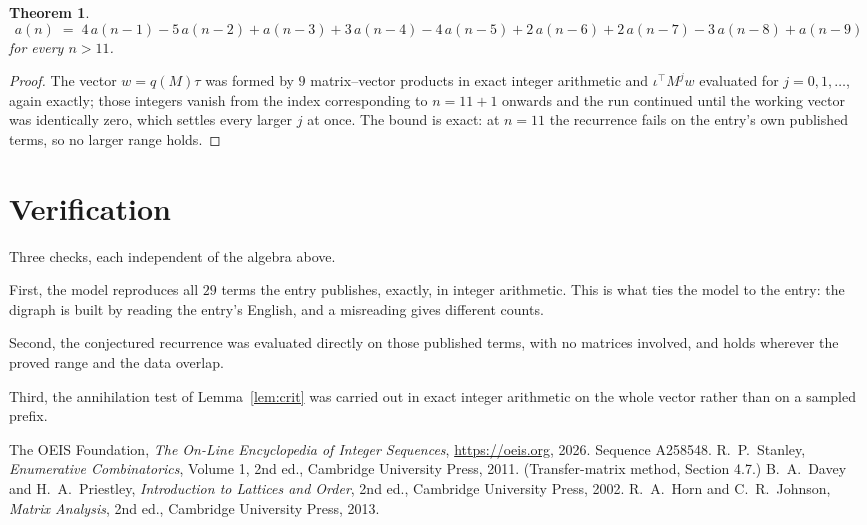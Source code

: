 \documentclass[11pt,a4paper]{article}
\theoremstyle{plain}
\newtheorem{theorem}{Theorem}
\theoremstyle{definition}
\begin{document}
\begin{theorem}
\[
a(n)\;=\;4\,a(n-1) - 5\,a(n-2) + a(n-3) + 3\,a(n-4) - 4\,a(n-5) + 2\,a(n-6) + 2\,a(n-7) - 3\,a(n-8) + a(n-9)
\]
for every $n>11$.
\end{theorem}

\begin{proof}
The vector $w=q(M)\tau$ was formed by $9$ matrix--vector products in exact integer
arithmetic and $\iota^{\!\top}M^{j}w$ evaluated for $j=0,1,\dots$, again exactly; those
integers vanish from the index corresponding to $n=11+1$ onwards and the run continued
until the working vector was identically zero, which settles every larger $j$ at once. The bound is exact: at $n=11$ the recurrence fails on the entry's own published terms, so no larger range holds.
\end{proof}

\section{Verification}

Three checks, each independent of the algebra above.

First, the model reproduces all $29$ terms the entry publishes, exactly, in integer
arithmetic. This is what ties the model to the entry: the digraph is built by reading the
entry's English, and a misreading gives different counts.

Second, the conjectured recurrence was evaluated directly on those published terms, with no
matrices involved, and holds wherever the proved range and the data overlap.

Third, the annihilation test of Lemma~\ref{lem:crit} was carried out in exact integer
arithmetic on the whole vector rather than on a sampled prefix.

\begin{thebibliography}{9}
 The OEIS Foundation, \emph{The On-Line Encyclopedia of Integer
Sequences}, \url{https://oeis.org}, 2026. Sequence A258548.
 R.~P.~Stanley, \emph{Enumerative Combinatorics}, Volume 1, 2nd ed.,
Cambridge University Press, 2011. (Transfer-matrix method, Section 4.7.)
 B.~A.~Davey and H.~A.~Priestley, \emph{Introduction to Lattices and
Order}, 2nd ed., Cambridge University Press, 2002.
 R.~A.~Horn and C.~R.~Johnson, \emph{Matrix Analysis}, 2nd ed., Cambridge
University Press, 2013.
\end{thebibliography}
\end{document}
